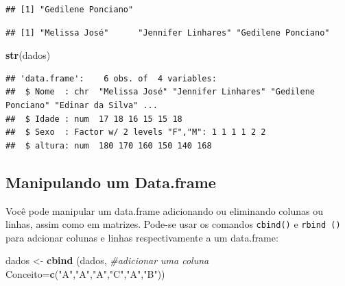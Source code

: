 \documentclass[
]{book}
\newenvironment{Shaded}{\begin{snugshade}}{\end{snugshade}}
\newcommand{\CommentTok}[1]{\textcolor[rgb]{0.56,0.35,0.01}{\textit{#1}}}
\newcommand{\DataTypeTok}[1]{\textcolor[rgb]{0.13,0.29,0.53}{#1}}
\newcommand{\DecValTok}[1]{\textcolor[rgb]{0.00,0.00,0.81}{#1}}
\newcommand{\KeywordTok}[1]{\textcolor[rgb]{0.13,0.29,0.53}{\textbf{#1}}}
\newcommand{\NormalTok}[1]{#1}
\newcommand{\OperatorTok}[1]{\textcolor[rgb]{0.81,0.36,0.00}{\textbf{#1}}}
\newcommand{\StringTok}[1]{\textcolor[rgb]{0.31,0.60,0.02}{#1}}
\begin{document}
\begin{verbatim}
## [1] "Gedilene Ponciano"
\end{verbatim}

\begin{Shaded}
\end{Shaded}

\begin{verbatim}
## [1] "Melissa José"      "Jennifer Linhares" "Gedilene Ponciano"
\end{verbatim}

\begin{Shaded}
\begin{Highlighting}[]
\KeywordTok{str}\NormalTok{(dados)}
\end{Highlighting}
\end{Shaded}

\begin{verbatim}
## 'data.frame':    6 obs. of  4 variables:
##  $ Nome  : chr  "Melissa José" "Jennifer Linhares" "Gedilene Ponciano" "Edinar da Silva" ...
##  $ Idade : num  17 18 16 15 15 18
##  $ Sexo  : Factor w/ 2 levels "F","M": 1 1 1 1 2 2
##  $ altura: num  180 170 160 150 140 168
\end{verbatim}

\hypertarget{manipulando-um-data.frame}{%
\subsection{Manipulando um Data.frame}\label{manipulando-um-data.frame}}

Você pode manipular um data.frame adicionando ou eliminando colunas ou linhas, assim como em matrizes. Pode-se usar os comandos \texttt{cbind()} e \texttt{rbind\ ()} para adcionar colunas e linhas respectivamente a um data.frame:

\begin{Shaded}
\begin{Highlighting}[]
\NormalTok{dados <-}\StringTok{ }\KeywordTok{cbind}\NormalTok{ (dados, }\CommentTok{#adicionar uma coluna}
               \DataTypeTok{Conceito=}\KeywordTok{c}\NormalTok{(}\StringTok{"A"}\NormalTok{,}\StringTok{"A"}\NormalTok{,}\StringTok{"A"}\NormalTok{,}\StringTok{"C"}\NormalTok{,}\StringTok{"A"}\NormalTok{,}\StringTok{"B"}\NormalTok{))}
\end{Highlighting}
\end{Shaded}
\end{document}
